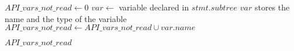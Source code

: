 \begin{algorithmic}[1]
	\State $API\_vars\_not\_read \leftarrow 0$
			\State $var \leftarrow$ variable declared in $stmt.subtree$
			\Comment $var$ stores the name and the type of the variable
				\State $API\_vars\_not\_read \leftarrow API\_vars\_not\_read \cup var.name$
			\EndIf
		\EndIf
	\EndFor
	
	\Return $API\_vars\_not\_read$
\EndProcedure
\end{algorithmic}